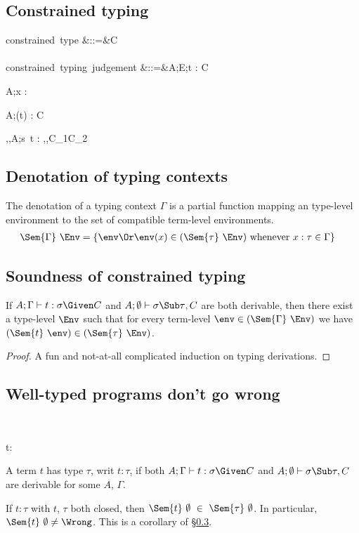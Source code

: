 \documentclass{amsart}
\theoremstyle{definition}
\begin{document}
\subsection{Constrained typing}
\begin{syntax}
\mbox{constrained type}
&::=&\tau \Given C
\\\\
\mbox{constrained typing judgement}
&::=&A;E;\Gamma \vdash t : \tau \Given C
\end{syntax}

{A;\Gamma\vdash x : \tau \Given \emptyset}

{A;\Gamma\vdash (t) : \sigma\R\tau \Given C}

{\alpha,\beta,A;\Gamma\vdash s~t : \beta \Given
\sigma\Sub\alpha\R\beta,\tau\Sub\alpha,C_1\cup C_2}

\subsection{Denotation of typing contexts}
The denotation of a typing context $\Gamma$ is a partial function
mapping an type-level environment to the set of compatible
term-level environments.
\begin{align*}
\Sem{\Gamma}~\Env&=
\left\{\env \Or
\env(x)\in(\Sem{\tau}~\Env)\text{ whenever }x:\tau\in\Gamma
\right\}
\end{align*}

\subsection{Soundness of constrained typing}
\label{consound}
If
$A;\Gamma\vdash t : \sigma\Given C$ and
$A;\emptyset\vdash{\sigma\Sub\tau},C$
are both derivable, then there exist a type-level $\Env$ such
that for every term-level $\env\in(\Sem{\Gamma}~\Env)$ we have
$(\Sem{t}~\env)\in(\Sem{\tau}~\Env)$.

\begin{proof}
A fun and not-at-all complicated induction on typing derivations.
\end{proof}

\subsection{Well-typed programs don't go wrong}~

{t:\tau}

A term $t$ has type $\tau$, writ $t:\tau$, if both
$A;\Gamma\vdash t : \sigma\Given C$ and
$A;\emptyset\vdash\sigma\Sub\tau,C$ are derivable for some $A$,
$\Gamma$.

If $t:\tau$ with $t$, $\tau$ both closed, then
$\Sem{t}~\emptyset~\in~\Sem{\tau}~\emptyset$. In particular,
$\Sem{t}~\emptyset\neq\Wrong$. This is a corollary of
\S\ref{consound}.




\end{document}
